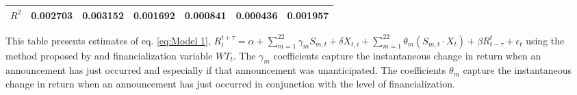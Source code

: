 \begin{sidewaystable}
{\begin{tabular}{@{}lllllllllllll@{}}
                        \\ \textbf{$R^2$}             &\multicolumn{2}{c}{ 0.002703 }                                                 & \multicolumn{2}{c}{ 0.003152 }                                                 & \multicolumn{2}{c}{ 0.001692 }                                                 & \multicolumn{2}{c}{ 0.000841 }                                                 & \multicolumn{2}{c}{ 0.000436 }                                                   & \multicolumn{2}{c}{ 0.001957 }                                                 \\ \bottomrule 
\end{tabular}
}
\begin{tablenotes}\item 
    \singlespacing
    \footnotesize
    This table presents estimates of eq. \ref{eq:Model 1}, $R_{t}^{t+\tau}=\alpha+\sum_{m=1}^{22} \gamma_m S_{m,t}+ \delta X_{t,i} + \sum_{m=1}^{22} \theta_m (S_{m,t} \cdot X_t)+\beta R_{t-\tau}^{t}+\epsilon_{t}$ using the method proposed by \citet{kurov2019price} and financialization variable $WT_t$. The $\gamma_m$ coefficients capture the instantaneous change in return when an announcement has just occurred and especially if that announcement was unanticipated. The coefficients $\theta_m$ capture the instantaneous change in return when an announcement has just occurred in conjunction with the level of financialization.
\end{tablenotes}
\end{sidewaystable}

